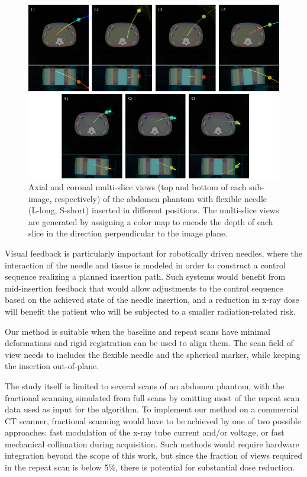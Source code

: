 \documentclass[letterpaper, 11 pt, conference]{ieeeconf} %
\begin{document}
\begin{figure}
\centering
\includegraphics[width=\textwidth]{multislices.png}
\caption{\small{Axial and coronal multi-slice views (top and bottom of each sub-image, respectively) of the abdomen phantom with flexible needle (L-long, S-short) inserted in different positions. The multi-slice views are generated by assigning a color map to encode the depth of each slice in the direction perpendicular to the image plane.}}
\label{multislices_fig}
\end{figure}

Visual feedback is particularly important for robotically driven needles, where the interaction of the needle and tissue is modeled in order to construct a control sequence realizing a planned insertion path. Such systems would benefit from mid-insertion feedback that would allow adjustments to the control sequence based on the achieved state of the needle insertion, and a reduction in x-ray dose will benefit the patient who will be subjected to a smaller radiation-related risk.


Our method is suitable when the baseline and repeat scans have minimal deformations and rigid registration can be used to align them. The scan field of view needs to includes the flexible needle and the spherical marker, while keeping the insertion out-of-plane.

The study itself is limited to several scans of an abdomen phantom, with the fractional scanning simulated from full scans by omitting most of the repeat scan data used as input for the algorithm. To implement our method on a commercial CT scanner, fractional scanning would have to be achieved by one of two possible approaches: fast modulation of the x-ray tube current and/or voltage, or fast mechanical collimation during acquisition. Such methods would require hardware integration beyond the scope of this work, but since the fraction of views required in the repeat scan is below 5\%, there is potential for substantial dose reduction.
\end{document}
